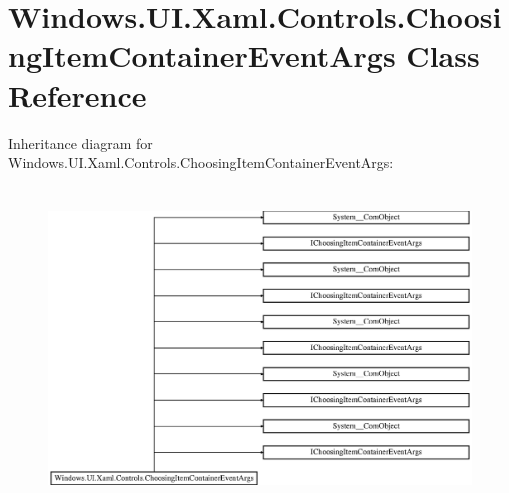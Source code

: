 \hypertarget{class_windows_1_1_u_i_1_1_xaml_1_1_controls_1_1_choosing_item_container_event_args}{}\section{Windows.\+U\+I.\+Xaml.\+Controls.\+Choosing\+Item\+Container\+Event\+Args Class Reference}
\label{class_windows_1_1_u_i_1_1_xaml_1_1_controls_1_1_choosing_item_container_event_args}
Inheritance diagram for Windows.\+U\+I.\+Xaml.\+Controls.\+Choosing\+Item\+Container\+Event\+Args\+:\begin{figure}[H]
\begin{center}
\leavevmode
\includegraphics[height=8.531857cm]{class_windows_1_1_u_i_1_1_xaml_1_1_controls_1_1_choosing_item_container_event_args}
\end{center}
\end{figure}
